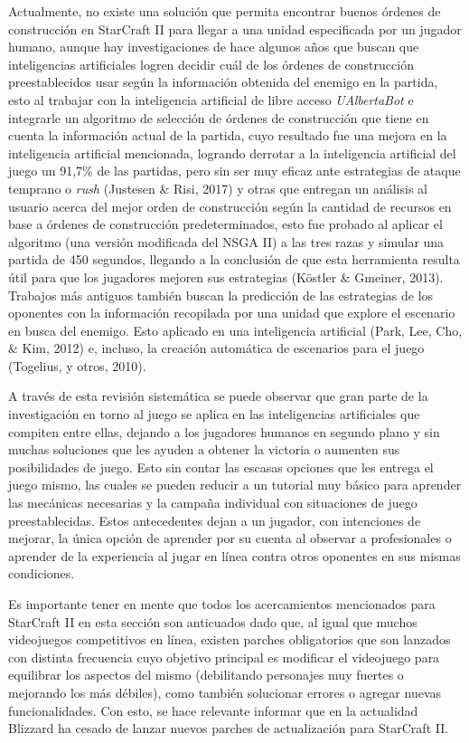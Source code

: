 Actualmente, no existe una solución que permita encontrar buenos órdenes de construcción en StarCraft II para llegar a una unidad especificada por un jugador humano, aunque hay investigaciones de hace algunos años que buscan que inteligencias artificiales logren decidir cuál de los órdenes de construcción preestablecidos usar según la información obtenida del enemigo en la partida, esto al trabajar con la inteligencia artificial de libre acceso \textit{UAlbertaBot} e integrarle un algoritmo de selección de órdenes de construcción que tiene en cuenta la información actual de la partida, cuyo resultado fue una mejora en la inteligencia artificial mencionada, logrando derrotar a la inteligencia artificial del juego un 91,7\% de las partidas, pero sin ser muy eficaz ante estrategias de ataque temprano o \textit{rush} (Justesen \& Risi, 2017) y otras que entregan un análisis al usuario acerca del mejor orden de construcción según la cantidad de recursos en base a órdenes de construcción predeterminados, esto fue probado al aplicar el algoritmo (una versión modificada del NSGA II) a las tres razas y simular una partida de 450 segundos, llegando a la conclusión de que esta herramienta resulta útil para que los jugadores mejoren sus estrategias (Köstler \& Gmeiner, 2013). Trabajos más antiguos también buscan la predicción de las estrategias de los oponentes con la información recopilada por una unidad que explore el escenario en busca del enemigo. Esto aplicado en una inteligencia artificial (Park, Lee, Cho, \& Kim, 2012) e, incluso, la creación automática de escenarios para el juego (Togelius, y otros, 2010).

A través de esta revisión sistemática se puede observar que gran parte de la investigación en torno al juego se aplica en las inteligencias artificiales que compiten entre ellas, dejando a los jugadores humanos en segundo plano y sin muchas soluciones que les ayuden a obtener la victoria o aumenten sus posibilidades de juego. Esto sin contar las escasas opciones que les entrega el juego mismo, las cuales se pueden reducir a un tutorial muy básico para aprender las mecánicas necesarias y la campaña individual con situaciones de juego preestablecidas. Estos antecedentes dejan a un jugador, con intenciones de mejorar, la única opción de aprender por su cuenta al observar a profesionales o aprender de la experiencia al jugar en línea contra otros oponentes en sus mismas condiciones.

Es importante tener en mente que todos los acercamientos mencionados para StarCraft II en esta sección son anticuados dado que, al igual que muchos videojuegos competitivos en línea, existen parches obligatorios que son lanzados con distinta frecuencia cuyo objetivo principal es modificar el videojuego para equilibrar los aspectos del mismo (debilitando personajes muy fuertes o mejorando los más débiles), como también solucionar errores o agregar nuevas funcionalidades. Con esto, se hace relevante informar que en la actualidad Blizzard ha cesado de lanzar nuevos parches de actualización para StarCraft II.

